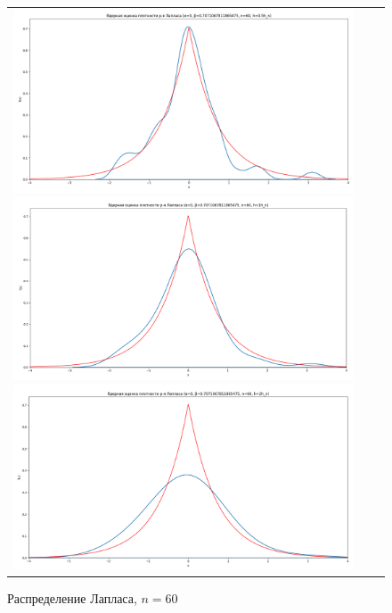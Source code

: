 \begin{figure}[H]
	\begin{tabular}{ccc}
		\includegraphics[scale=0.14]{resources/4_laplace_60_half.png}
		\includegraphics[scale=0.14]{resources/4_laplace_60_one.png}
		\includegraphics[scale=0.14]{resources/4_laplace_60_two.png}
	\end{tabular}
	\caption{Распределение Лапласа, $n=60$}
\end{figure}

